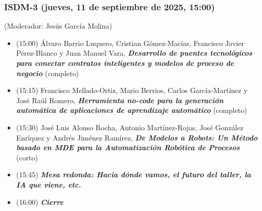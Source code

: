 \begin{frame}
  \frametitle{ISDM-3 (jueves, 11 de septiembre de 2025, 15:00)}
{\small (Moderador: Jesús García Molina)}
\begin{itemize}

  \item (15:00) Álvaro Barrio Luquero, Cristian Gómez-Macías, Francisco Javier Pérez-Blanco y Juan Manuel Vara, %
        {\bfseries\itshape Desarrollo de puentes tecnológicos para conectar contratos inteligentes y modelos de proceso de negocio} %
        (completo)

  \item (15:15) Francisco Mellado-Ortiz, Mario Berrios, Carlos García-Martínez y José Raúl Romero, %
        {\bfseries\itshape Herramienta no-code para la generación automática de aplicaciones de aprendizaje automático} %
        (completo)

  \item (15:30) José Luis Alonso Rocha, Antonio Martínez-Rojas, José González Enríquez y Andrés Jiménez Ramírez, %
        {\bfseries\itshape De Modelos a Robots: Un Método basado en MDE para la Automatización Robótica de Procesos} %
        (corto)

  \item (15:45) {\bfseries\itshape Mesa redonda: Hacia dónde vamos, el futuro del taller, la IA que viene, etc.}

  \item (16:00) {\bfseries\itshape Cierre}

\end{itemize}
\end{frame}